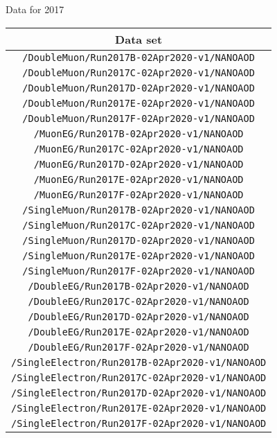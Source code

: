 Data for 2017
\begin{table}[!h]
\label{tab:datasets2017}
\begin{center}
{\footnotesize
\begin{tabular}{c}
\hline
Data set  \\
\hline
\texttt{/DoubleMuon/Run2017B-02Apr2020-v1/NANOAOD} \\
\texttt{/DoubleMuon/Run2017C-02Apr2020-v1/NANOAOD} \\
\texttt{/DoubleMuon/Run2017D-02Apr2020-v1/NANOAOD} \\
\texttt{/DoubleMuon/Run2017E-02Apr2020-v1/NANOAOD} \\
\texttt{/DoubleMuon/Run2017F-02Apr2020-v1/NANOAOD} \\
\texttt{/MuonEG/Run2017B-02Apr2020-v1/NANOAOD} \\
\texttt{/MuonEG/Run2017C-02Apr2020-v1/NANOAOD} \\
\texttt{/MuonEG/Run2017D-02Apr2020-v1/NANOAOD} \\
\texttt{/MuonEG/Run2017E-02Apr2020-v1/NANOAOD} \\
\texttt{/MuonEG/Run2017F-02Apr2020-v1/NANOAOD} \\
\texttt{/SingleMuon/Run2017B-02Apr2020-v1/NANOAOD} \\
\texttt{/SingleMuon/Run2017C-02Apr2020-v1/NANOAOD} \\
\texttt{/SingleMuon/Run2017D-02Apr2020-v1/NANOAOD} \\
\texttt{/SingleMuon/Run2017E-02Apr2020-v1/NANOAOD} \\
\texttt{/SingleMuon/Run2017F-02Apr2020-v1/NANOAOD} \\
\texttt{/DoubleEG/Run2017B-02Apr2020-v1/NANOAOD} \\
\texttt{/DoubleEG/Run2017C-02Apr2020-v1/NANOAOD} \\
\texttt{/DoubleEG/Run2017D-02Apr2020-v1/NANOAOD} \\
\texttt{/DoubleEG/Run2017E-02Apr2020-v1/NANOAOD} \\
\texttt{/DoubleEG/Run2017F-02Apr2020-v1/NANOAOD} \\
\texttt{/SingleElectron/Run2017B-02Apr2020-v1/NANOAOD} \\
\texttt{/SingleElectron/Run2017C-02Apr2020-v1/NANOAOD} \\
\texttt{/SingleElectron/Run2017D-02Apr2020-v1/NANOAOD} \\
\texttt{/SingleElectron/Run2017E-02Apr2020-v1/NANOAOD} \\
\texttt{/SingleElectron/Run2017F-02Apr2020-v1/NANOAOD} \\
\hline
\end{tabular}
} %
\end{center}
\end{table}

